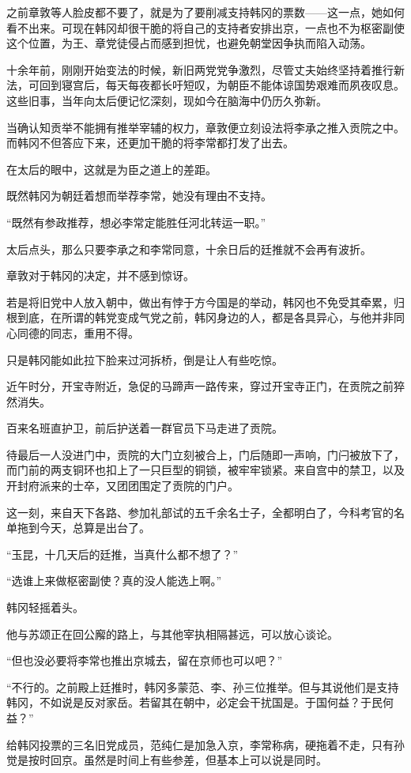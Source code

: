 之前章敦等人脸皮都不要了，就是为了要削减支持韩冈的票数——这一点，她如何看不出来。可现在韩冈却很干脆的将自己的支持者安排出京，一点也不为枢密副使这个位置，为王、章党徒侵占而感到担忧，也避免朝堂因争执而陷入动荡。

十余年前，刚刚开始变法的时候，新旧两党党争激烈，尽管丈夫始终坚持着推行新法，可回到寝宫后，每天每夜都长吁短叹，为朝臣不能体谅国势艰难而夙夜叹息。这些旧事，当年向太后便记忆深刻，现如今在脑海中仍历久弥新。

当确认知贡举不能拥有推举宰辅的权力，章敦便立刻设法将李承之推入贡院之中。而韩冈不但答应下来，还更加干脆的将李常都打发了出去。

在太后的眼中，这就是为臣之道上的差距。

既然韩冈为朝廷着想而举荐李常，她没有理由不支持。

“既然有参政推荐，想必李常定能胜任河北转运一职。”

太后点头，那么只要李承之和李常同意，十余日后的廷推就不会再有波折。

章敦对于韩冈的决定，并不感到惊讶。

若是将旧党中人放入朝中，做出有悖于方今国是的举动，韩冈也不免受其牵累，归根到底，在所谓的韩党变成气党之前，韩冈身边的人，都是各具异心，与他并非同心同德的同志，重用不得。

只是韩冈能如此拉下脸来过河拆桥，倒是让人有些吃惊。

近午时分，开宝寺附近，急促的马蹄声一路传来，穿过开宝寺正门，在贡院之前猝然消失。

百来名班直护卫，前后护送着一群官员下马走进了贡院。

待最后一人没进门中，贡院的大门立刻被合上，门后随即一声响，门闩被放下了，而门前的两支铜环也扣上了一只巨型的铜锁，被牢牢锁紧。来自宫中的禁卫，以及开封府派来的士卒，又团团围定了贡院的门户。

这一刻，来自天下各路、参加礼部试的五千余名士子，全都明白了，今科考官的名单拖到今天，总算是出台了。

“玉昆，十几天后的廷推，当真什么都不想了？”

“选谁上来做枢密副使？真的没人能选上啊。”

韩冈轻摇着头。

他与苏颂正在回公廨的路上，与其他宰执相隔甚远，可以放心谈论。

“但也没必要将李常也推出京城去，留在京师也可以吧？”

“不行的。之前殿上廷推时，韩冈多蒙范、李、孙三位推举。但与其说他们是支持韩冈，不如说是反对家岳。若留其在朝中，必定会干扰国是。于国何益？于民何益？”

给韩冈投票的三名旧党成员，范纯仁是加急入京，李常称病，硬拖着不走，只有孙觉是按时回京。虽然是时间上有些参差，但基本上可以说是同时。

